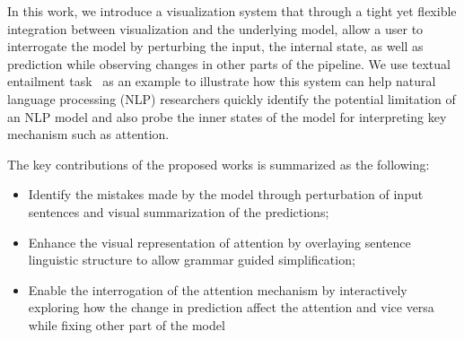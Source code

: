 In this work, we introduce a visualization system that through a tight yet flexible integration between visualization and the underlying model, allow a user to interrogate the model by perturbing the input, the internal state, as well as prediction while observing changes in other parts of the pipeline.
We use textual entailment task~\cite{} as an example to illustrate how this system can help natural language processing (NLP) researchers quickly identify the potential limitation of an NLP model and also probe the inner states of the model for interpreting key mechanism such as attention.

%
%


The key contributions of the proposed works is summarized as the following:
\begin{itemize}
    \item Identify the mistakes made by the model through perturbation of input sentences and visual summarization of the predictions;

    \item Enhance the visual representation of attention by overlaying sentence linguistic structure to allow grammar guided simplification;

    \item Enable the interrogation of the attention mechanism by interactively exploring how the change in prediction affect the attention and vice versa while fixing other part of the model

\end{itemize}

%
%
